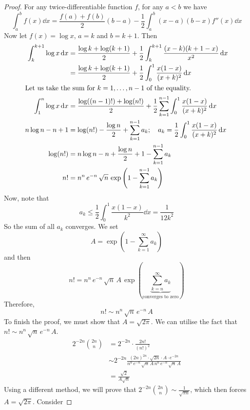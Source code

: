 \begin{proof}
	For any twice-differentiable function $f$, for any $a < b$ we have
	\[ \int_a^b f(x) \dd{x} = \frac{f(a) + f(b)}{2} (b - a) - \frac{1}{2}\int_a^b (x-a)(b-x)f''(x)\dd{x} \]
	Now let $f(x) = \log x$, $a=k$ and $b=k+1$. Then
	\begin{align*}
		\int_k^{k+1} \log x \dd{x} & = \frac{\log k + \log(k+1)}{2} + \frac{1}{2}\int_k^{k+1} \frac{(x-k)(k+1-x)}{x^2}\dd{x}                            \\
		                           & = \frac{\log k + \log(k+1)}{2} + \frac{1}{2}\int_0^1 \frac{x(1-x)}{(x+k)^2}\dd{x}                                  \\
		\intertext{Let us take the sum for $k=1, \dots, n-1$ of the equality.}
		\int_1^n \log x \dd{x}     & = \frac{\log ((n-1)!) + \log(n!)}{2} + \frac{1}{2}\sum_{k=1}^{n-1}\int_0^1 \frac{x(1-x)}{(x+k)^2}\dd{x}            \\
		n\log n - n + 1            & = \log (n!) - \frac{\log n}{2} + \sum_{k=1}^{n-1} a_k;\quad a_k = \frac{1}{2}\int_0^1 \frac{x(1-x)}{(x+k)^2}\dd{x} \\
		\log (n!)                  & = n \log n - n + \frac{\log n}{2} + 1 - \sum_{k=1}^{n-1} a_k                                                       \\
		n!                         & = n^n \, e^{-n} \, \sqrt n \, \exp\left( 1 - \sum_{k=1}^{n-1} a_k \right)
	\end{align*}
	Now, note that
	\[ a_k \leq \frac{1}{2}\int_0^1 \frac{x(1-x)}{k^2}\dd{x} = \frac{1}{12k^2} \]
	So the sum of all $a_k$ converges. We set
	\[ A = \exp\left( 1 - \sum_{k=1}^\infty a_k \right) \]
	and then
	\[ n! = n^n \, e^{-n} \, \sqrt n \, A \, \exp\left( \underbrace{\sum_{k=n}^\infty a_k}_{\text{converges to zero}} \right) \]
	Therefore,
	\[ n! \sim n^n\, \sqrt{n}\, e^{-n}\, A \]
	To finish the proof, we must show that $A = \sqrt{2 \pi}$. We can utilise the fact that $n! \sim n^n\, \sqrt{n}\, e^{-n}\, A$.
	\begin{align*}
		2^{-2n} \binom{2n}{n} & = 2^{-2n} \cdot \frac{2n!}{(n!)^2}                                                                                           \\
		                      & \sim 2^{-2n} \frac{(2n)^{2n} \cdot \sqrt{2n} \cdot A \cdot e^{-2n}}{n^n\, e^{-n}\, \sqrt n\, A\, n^n\, e^{-n}\, \sqrt n\, A} \\
		                      & = \frac{\sqrt{2}}{A\sqrt{n}}
	\end{align*}
	Using a different method, we will prove that $2^{-2n} \binom{2n}{n} \sim \frac{1}{\sqrt{\pi n}}$, which then forces $A = \sqrt{2\pi}$. Consider

\end{proof}
